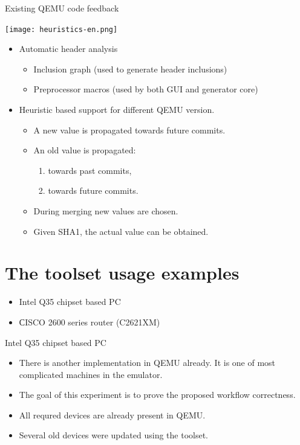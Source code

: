 \documentclass[unicode,hyperref={unicode=true},aspectratio=169]{beamer}
\newcommand*{\sectionpagekb}{\usebeamertemplate*{section page kb}}
\begin{document}
\begin{frame}{Existing QEMU code feedback}
\begin{minipage}{0.35\textwidth}
\texttt{[image: heuristics-en.png]}
\end{minipage}
\hfill
\begin{minipage}{0.63\textwidth}
\begin{itemize}
\item Automatic header analysis
    \begin{itemize}
    \item Inclusion graph (used to generate header inclusions)
    \item Preprocessor macros (used by both GUI and generator core)
    \end{itemize}
\item Heuristic based support for different QEMU version.
    \begin{itemize}
    \item A new value is propagated towards future commits.
    \item An old value is propagated:
        \begin{enumerate}
        \item towards past commits,
        \item towards future commits.
        \end{enumerate}
    \item During merging new values are chosen.
    \item Given SHA1, the actual value can be obtained.
    \end{itemize}
\end{itemize}
\end{minipage}
\end{frame}



\section{The toolset usage examples}
\begin{frame}
\sectionpagekb
\begin{itemize}
\item Intel Q35 chipset based PC
\item СISCO 2600 series router (C2621XM)
\end{itemize}
\end{frame}



\begin{frame}{Intel Q35 chipset based PC}
\begin{itemize}
\item There is another implementation in QEMU already. It is one of most
complicated machines in the emulator.
\item The goal of this experiment is to prove the proposed workflow correctness.
\item All requred devices are already present in QEMU.
\item Several old devices were updated using the toolset.
\end{itemize}
\end{frame}
\end{document}
